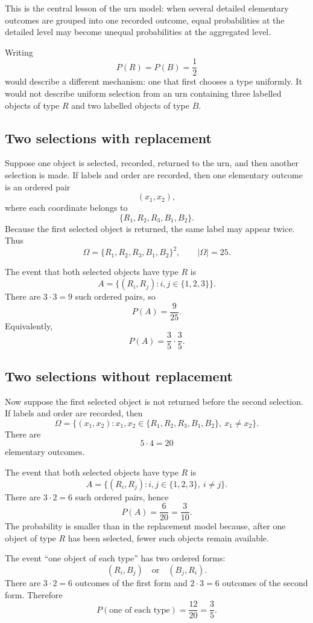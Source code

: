 This is the central lesson of the urn model: when several detailed elementary
outcomes are grouped into one recorded outcome, equal probabilities at the
detailed level may become unequal probabilities at the aggregated level.

\begin{examplebox}
Writing
\[
P(R)=P(B)=\frac12
\]
would describe a different mechanism: one that first chooses a type uniformly.
It would not describe uniform selection from an urn containing three labelled
objects of type \(R\) and two labelled objects of type \(B\).
\end{examplebox}

\subsection*{Two selections with replacement}

Suppose one object is selected, recorded, returned to the urn, and then another
selection is made. If labels and order are recorded, then one elementary outcome
is an ordered pair
\[
(x_1,x_2),
\]
where each coordinate belongs to
\[
\{R_1,R_2,R_3,B_1,B_2\}.
\]
Because the first selected object is returned, the same label may appear twice.
Thus
\[
\Omega=\{R_1,R_2,R_3,B_1,B_2\}^2,\qquad |\Omega|=25.
\]

The event that both selected objects have type \(R\) is
\[
A=\{(R_i,R_j):i,j\in\{1,2,3\}\}.
\]
There are \(3\cdot3=9\) such ordered pairs, so
\[
P(A)=\frac9{25}.
\]
Equivalently,
\[
P(A)=\frac35\cdot\frac35.
\]

\subsection*{Two selections without replacement}

Now suppose the first selected object is not returned before the second
selection. If labels and order are recorded, then
\[
\Omega=\{(x_1,x_2):x_1,x_2\in\{R_1,R_2,R_3,B_1,B_2\},\ x_1\neq x_2\}.
\]
There are
\[
5\cdot4=20
\]
elementary outcomes.

The event that both selected objects have type \(R\) is
\[
A=\{(R_i,R_j): i,j\in\{1,2,3\},\ i\neq j\}.
\]
There are \(3\cdot2=6\) such ordered pairs, hence
\[
P(A)=\frac6{20}=\frac3{10}.
\]
The probability is smaller than in the replacement model because, after one
object of type \(R\) has been selected, fewer such objects remain available.

\begin{examplebox}
The event ``one object of each type'' has two ordered forms:
\[
(R_i,B_j)\quad\text{or}\quad(B_j,R_i).
\]
There are \(3\cdot2=6\) outcomes of the first form and \(2\cdot3=6\) outcomes of
the second form. Therefore
\[
P(\text{one of each type})=\frac{12}{20}=\frac35.
\]
\end{examplebox}

